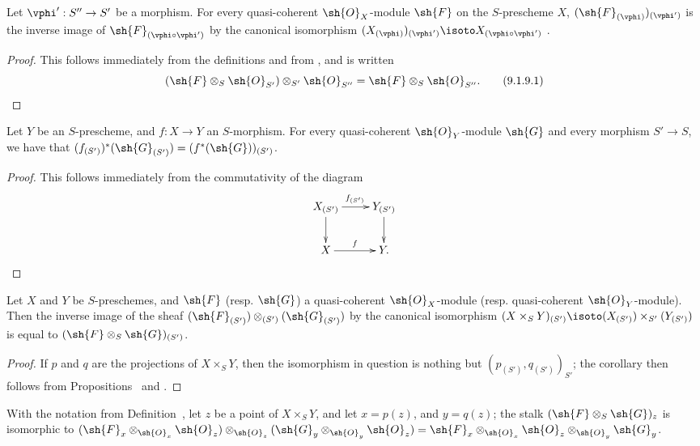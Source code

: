 \begin{proposition}[9.1.9]
\label{I.9.1.9}
Let $\vphi':S''\to S'$ be a morphism.
For every quasi-coherent $\sh{O}_X$-module $\sh{F}$ on the $S$-prescheme $X$,
$(\sh{F}_{(\vphi)})_{(\vphi')}$ is the inverse image of
$\sh{F}_{(\vphi\circ\vphi')}$ by the canonical isomorphism
$(X_{(\vphi)})_{(\vphi')}\isoto X_{(\vphi\circ\vphi')}$
.
\end{proposition}

\begin{proof}
This follows immediately from the definitions and from , and is
written
\[
\label{I.9.1.9.1}
  (\sh{F}\otimes_S\sh{O}_{S'})\otimes_{S'}\sh{O}_{S''}=\sh{F}\otimes_S\sh{O}_{S''}.
  \tag{9.1.9.1}
\]
\end{proof}

\begin{proposition}[9.1.10]
\label{I.9.1.10}
Let $Y$ be an $S$-prescheme, and $f:X\to Y$ an $S$-morphism.
For every quasi-coherent $\sh{O}_Y$-module $\sh{G}$ and every morphism
$S'\to S$, we have that
$(f_{(S')})^*(\sh{G}_{(S')})=(f^*(\sh{G}))_{(S')}$.
\end{proposition}

\begin{proof}
This follows immediately from the commutativity of the diagram
\[
  \xymatrix{
    X_{(S')}\ar[r]^{f_{(S')}}\ar[d] &
    Y_{(S')}\ar[d]\\
    X\ar[r]^f &
    Y.
  }
\]
\end{proof}

\begin{corollary}[9.1.11]
\label{I.9.1.11}
Let $X$ and $Y$ be $S$-preschemes, and
$\sh{F}$ (resp. $\sh{G}$) a quasi-coherent $\sh{O}_X$-module
(resp. quasi-coherent $\sh{O}_Y$-module). Then the inverse image of the sheaf
$(\sh{F}_{(S')})\otimes_{(S')}(\sh{G}_{(S')})$ by the canonical isomorphism
$(X\times_S Y)_{(S')}\isoto(X_{(S')})\times_{S'}(Y_{(S')})$
 is equal to $(\sh{F}\otimes_S\sh{G})_{(S')}$.
\end{corollary}

\begin{proof}
If $p$ and $q$ are the projections of $X\times_S Y$, then the isomorphism in question
is nothing but $(p_{(S')}, q_{(S')})_{S'}$; the corollary then follows from
Propositions~ and .
\end{proof}

\begin{proposition}[9.1.12]
\label{I.9.1.12}
With the notation from Definition~, let $z$ be
a point of $X\times_S Y$, and let $x=p(z)$, and $y=q(z)$; the stalk
$(\sh{F}\otimes_S\sh{G})_z$ is isomorphic to
$(\sh{F}_x\otimes_{\sh{O}_x}\sh{O}_z)\otimes_{\sh{O}_z}(\sh{G}_y\otimes_{\sh{O}_y}\sh{O}_z)
  =\sh{F}_x\otimes_{\sh{O}_x}\sh{O}_z\otimes_{\sh{O}_y}\sh{G}_y$.
\end{proposition}

